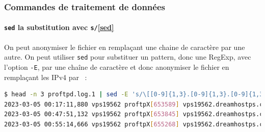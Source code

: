 \documentclass{beamer}
\begin{document}
    \begin{frame}[fragile]
        \transdissolve
        \frametitle{Commandes de traitement de données}
        \framesubtitle{\lstinline{sed} la substitution avec \lstinline{s/}\cref{sed}}
        On peut anonymiser le fichier en remplaçant une chaine de caractère par une autre.
        On peut utiliser \lstinline{sed} pour substituer un pattern, donc une RegExp, avec l'option \lstinline{-E}, par une chaîne de caractère et donc anonymiser le fichier en remplaçant les IPv4 par ~:
        \begin{lstlisting}[language=bash,basicstyle=\tiny\ttfamily]
$ head -n 3 proftpd.log.1 | sed -E 's/\[[0-9]{1,3}.[0-9]{1,3}.[0-9]{1,3}.[0-9]{1,3}\]/[xxx.xxx.xxx.xxx]/g'
2023-03-05 00:17:11,880 vps19562 proftpX[653589] vps19562.dreamhostps.com: ProFTPD 1.3.6c (maint) (built Thu Feb 27 2020 19:34:56 UTC) standalone mode STARTUP
2023-03-05 00:47:51,132 vps19562 proftpX[653845] vps19562.dreamhostps.com (aurora.probe.onyphe.net[xxx.xxx.xxx.xxx]): USER anonymous: no such user found from aurora.probe.onyphe.net [xxx.xxx.xxx.xxx] to ::ffff:66.33.201.239:21
2023-03-05 00:55:14,666 vps19562 proftpX[655268] vps19562.dreamhostps.com (hodson.probe.onyphe.net[xxx.xxx.xxx.xxx]): USER anonymous: no such user found from hodson.probe.onyphe.net [xxx.xxx.xxx.xxx] to ::ffff:66.33.201.239:21
        \end{lstlisting}
    \end{frame}
\end{document}
